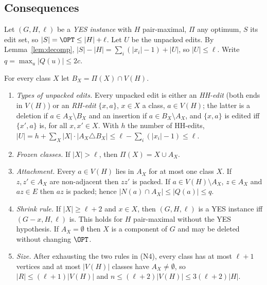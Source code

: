 \subsection{Consequences}\label{sec:conseq}
Let $(G,H,\ell)$ be a \emph{YES instance} with $H$ pair-maximal, $\Pi$ any optimum, $S$ its edit set, so $|S|=\OPT\le|H|+\ell$. Let $U$ be the unpacked edits. By Lemma~\ref{lem:decomp}, $|S|-|H|=\sum_i(|x_i|-1)+|U|$, so $|U|\le\ell$.  Write $q=\max_u|Q(u)|\le 2c$.

\begin{corollary}\label{cor:nf}
For every class $X$ let $B_X=\Pi(X)\cap V(H)$.
\begin{enumerate}
\item[(N1)] \emph{Types of unpacked edits.} Every unpacked edit is either an \emph{HH-edit} (both ends in $V(H)$) or an \emph{RH-edit} $\{x,a\}$, $x\in X$ a class, $a\in V(H)$; the latter is a deletion if $a\in A_X\setminus B_X$ and an insertion if $a\in B_X\setminus A_X$, and $\{x,a\}$ is edited iff $\{x',a\}$ is, for all $x,x'\in X$. With $h$ the number of HH-edits,
$|U|=h+\sum_X|X|\cdot|A_X\triangle B_X|\le\ell-\sum_i(|x_i|-1)\le \ell.$
\item[(N2)] \emph{Frozen classes.} If $|X|>\ell$, then $\Pi(X)=X\cup A_X$.
\item[(N3)] \emph{Attachment.} Every $a\in V(H)$ lies in $A_X$ for at most one class $X$. If $z,z'\in A_X$ are non-adjacent then $zz'$ is packed. If $a\in V(H)\setminus A_X$, $z\in A_X$ and $az\in E$ then $az$ is packed; hence $|N(a)\cap A_X|\le|Q(a)|\le q$.
\item[(N4)] \emph{Shrink rule.} If $|X|\ge\ell+2$ and $x\in X$, then $(G,H,\ell)$ is a YES instance iff $(G-x,H,\ell)$ is. This holds for $H$ pair-maximal without the YES hypothesis. If $A_X=\emptyset$ then $X$ is a component of $G$ and may be deleted without changing $\OPT$.
\item[(N5)] \emph{Size.} After exhausting the two rules in (N4), every class has at most $\ell+1$ vertices and at most $|V(H)|$ classes have $A_X\ne\emptyset$, so $|R|\le(\ell+1)|V(H)|$ and $n\le(\ell+2)|V(H)|\le 3(\ell+2)|H|$.
\end{enumerate}
\end{corollary}
